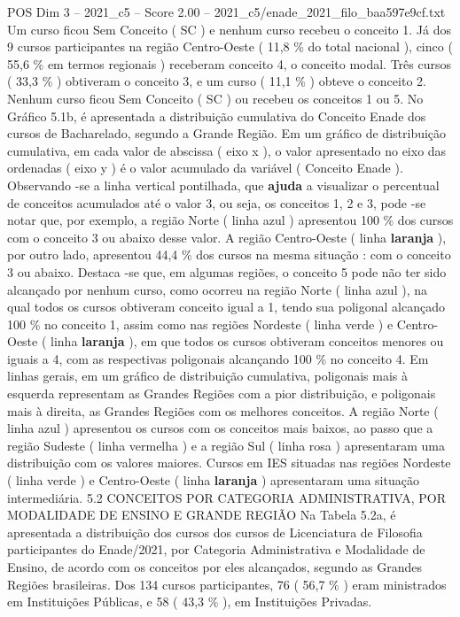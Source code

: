 \begin{textsample}{POS Dim 3 – 2021\_c5 – Score 2.00 – 2021\_c5/enade\_2021\_filo\_baa597e9cf.txt}
Um curso ficou Sem Conceito ( SC ) e nenhum curso recebeu o conceito 1.
Já dos 9 cursos participantes na região Centro-Oeste ( 11,8 \% do total nacional ), cinco ( 55,6 \% em termos regionais ) receberam conceito 4, o conceito modal.
Três cursos ( 33,3 \% ) obtiveram o conceito 3, e um curso ( 11,1 \% ) obteve o conceito 2.
Nenhum curso ficou Sem Conceito ( SC ) ou recebeu os conceitos 1 ou 5.
No Gráfico 5.1b, é apresentada a distribuição cumulativa do Conceito Enade dos cursos de Bacharelado, segundo a Grande Região.
Em um gráfico de distribuição cumulativa, em cada valor de abscissa ( eixo x ), o valor apresentado no eixo das ordenadas ( eixo y ) é o valor acumulado da variável ( Conceito Enade ).
Observando -se a linha vertical pontilhada, que \textbf{ajuda} a visualizar o percentual de conceitos acumulados até o valor 3, ou seja, os conceitos 1, 2 e 3, pode -se notar que, por exemplo, a região Norte ( linha azul ) apresentou 100 \% dos cursos com o conceito 3 ou abaixo desse valor.
A região Centro-Oeste ( linha \textbf{laranja} ), por outro lado, apresentou 44,4 \% dos cursos na mesma situação : com o conceito 3 ou abaixo.
Destaca -se que, em algumas regiões, o conceito 5 pode não ter sido alcançado por nenhum curso, como ocorreu na região Norte ( linha azul ), na qual todos os cursos obtiveram conceito igual a 1, tendo sua poligonal alcançado 100 \% no conceito 1, assim como nas regiões Nordeste ( linha verde ) e Centro-Oeste ( linha \textbf{laranja} ), em que todos os cursos obtiveram conceitos menores ou iguais a 4, com as respectivas poligonais alcançando 100 \% no conceito 4.
Em linhas gerais, em um gráfico de distribuição cumulativa, poligonais mais à esquerda representam as Grandes Regiões com a pior distribuição, e poligonais mais à direita, as Grandes Regiões com os melhores conceitos.
A região Norte ( linha azul ) apresentou os cursos com os conceitos mais baixos, ao passo que a região Sudeste ( linha vermelha ) e a região Sul ( linha rosa ) apresentaram uma distribuição com os valores maiores.
Cursos em IES situadas nas regiões Nordeste ( linha verde ) e Centro-Oeste ( linha \textbf{laranja} ) apresentaram uma situação intermediária. 5.2 CONCEITOS POR CATEGORIA ADMINISTRATIVA, POR MODALIDADE DE ENSINO E GRANDE REGIÃO Na Tabela 5.2a, é apresentada a distribuição dos cursos dos cursos de Licenciatura de Filosofia participantes do Enade/2021, por Categoria Administrativa e Modalidade de Ensino, de acordo com os conceitos por eles alcançados, segundo as Grandes Regiões brasileiras.
Dos 134 cursos participantes, 76 ( 56,7 \% ) eram ministrados em Instituições Públicas, e 58 ( 43,3 \% ), em Instituições Privadas.

\end{textsample}
